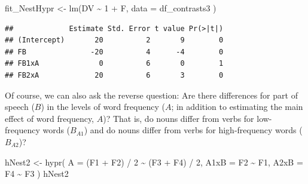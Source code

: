 \documentclass[
  12pt,
]{krantz}
\newenvironment{Shaded}{\begin{snugshade}}{\end{snugshade}}
\newcommand{\AttributeTok}[1]{\textcolor[rgb]{0.77,0.63,0.00}{#1}}
\newcommand{\DecValTok}[1]{\textcolor[rgb]{0.00,0.00,0.81}{#1}}
\newcommand{\FunctionTok}[1]{\textcolor[rgb]{0.00,0.00,0.00}{#1}}
\newcommand{\NormalTok}[1]{#1}
\newcommand{\OtherTok}[1]{\textcolor[rgb]{0.56,0.35,0.01}{#1}}
\newcommand{\SpecialCharTok}[1]{\textcolor[rgb]{0.00,0.00,0.00}{#1}}
\theoremstyle{definition}
\theoremstyle{definition}
\theoremstyle{definition}
\theoremstyle{definition}
\theoremstyle{remark}
\begin{document}
\begin{Shaded}
\end{Shaded}

\begin{Shaded}
\begin{Highlighting}[]
\NormalTok{fit\_NestHypr }\OtherTok{\textless{}{-}} \FunctionTok{lm}\NormalTok{(DV }\SpecialCharTok{\textasciitilde{}} \DecValTok{1} \SpecialCharTok{+}\NormalTok{ F,}
  \AttributeTok{data =}\NormalTok{ df\_contrasts3}
\NormalTok{)}
\end{Highlighting}
\end{Shaded}

\begin{Shaded}
\end{Shaded}

\begin{verbatim}
##             Estimate Std. Error t value Pr(>|t|)
## (Intercept)       20          2       9        0
## FB               -20          4      -4        0
## FB1xA              0          6       0        1
## FB2xA             20          6       3        0
\end{verbatim}

Of course, we can also ask the reverse question: Are there differences for part of speech (\(B\)) in the levels of word frequency (\(A\); in addition to estimating the main effect of word frequency, \(A\))? That is, do nouns differ from verbs for low-frequency words (\(B_{A1}\)) and do nouns differ from verbs for high-frequency words (\(B_{A2}\))?

\begin{Shaded}
\begin{Highlighting}[]
\NormalTok{hNest2 }\OtherTok{\textless{}{-}} \FunctionTok{hypr}\NormalTok{(}
  \AttributeTok{A =}\NormalTok{ (F1 }\SpecialCharTok{+}\NormalTok{ F2) }\SpecialCharTok{/} \DecValTok{2} \SpecialCharTok{\textasciitilde{}}\NormalTok{ (F3 }\SpecialCharTok{+}\NormalTok{ F4) }\SpecialCharTok{/} \DecValTok{2}\NormalTok{,}
  \AttributeTok{A1xB =}\NormalTok{ F2 }\SpecialCharTok{\textasciitilde{}}\NormalTok{ F1,}
  \AttributeTok{A2xB =}\NormalTok{ F4 }\SpecialCharTok{\textasciitilde{}}\NormalTok{ F3}
\NormalTok{)}
\NormalTok{hNest2}
\end{Highlighting}
\end{Shaded}
\end{document}
